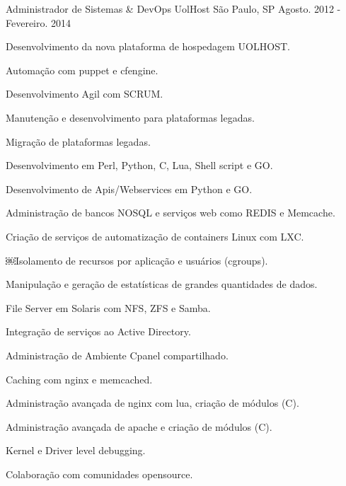 \begin{cventries}
  \cventry
    {Administrador de Sistemas \& DevOps} %
    {UolHost} %
    {São Paulo, SP} %
    {Agosto. 2012 - Fevereiro. 2014} %
    {
      \begin{cvitems} %
          \item {Desenvolvimento da nova plataforma de hospedagem UOLHOST.}
          \item {Automação com puppet e cfengine.}
          \item {Desenvolvimento Agil com SCRUM.}
          \item {Manutenção e desenvolvimento para plataformas legadas.}
          \item {Migração de plataformas legadas.}
          \item {Desenvolvimento em Perl, Python, C, Lua, Shell script e GO.}
          \item {Desenvolvimento de Apis/Webservices em Python e GO.}
          \item {Administração de bancos NOSQL e serviços web como REDIS e Memcache.}
          \item {Criação de serviços de automatização de containers Linux com LXC.}
          \item {￼Isolamento de recursos por aplicação e usuários (cgroups).}
          \item {Manipulação e geração de estatísticas de grandes quantidades de dados.}
          \item {File Server em Solaris com NFS, ZFS e Samba.}
          \item {Integração de serviços ao Active Directory.}
          \item {Administração de Ambiente Cpanel compartilhado.}
          \item {Caching com nginx e memcached.}
          \item {Administração avançada de nginx com lua, criação de módulos (C).}
          \item {Administração avançada de apache e criação de módulos (C).}
          \item {Kernel e Driver level debugging.}
          \item {Colaboração com comunidades opensource.}
      \end{cvitems}
    }


\end{cventries}
